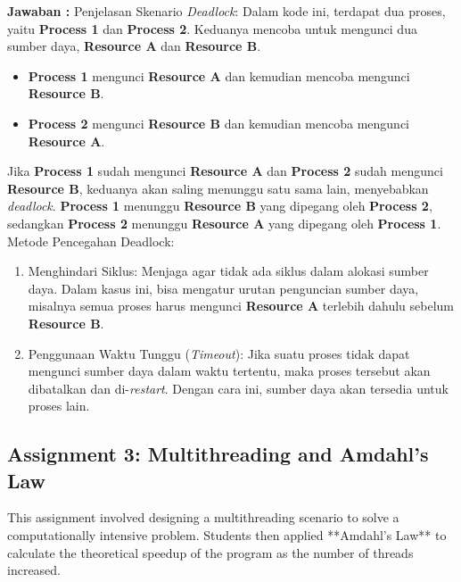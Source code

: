 \documentclass[12pt]{article}
\begin{document}
\textbf{Jawaban : }
Penjelasan Skenario \textit{Deadlock}:
Dalam kode ini, terdapat dua proses, yaitu \textbf{Process 1} dan \textbf{Process 2}. Keduanya mencoba untuk mengunci dua sumber daya, \textbf{Resource A} dan \textbf{\textbf{Resource B}}.
\begin{itemize}
    \item \textbf{Process 1} mengunci \textbf{Resource A} dan kemudian mencoba mengunci \textbf{Resource B}.
    \item \textbf{Process 2} mengunci \textbf{Resource B} dan kemudian mencoba mengunci \textbf{Resource A}.
\end{itemize}
Jika \textbf{Process 1} sudah mengunci \textbf{Resource A} dan \textbf{Process 2} sudah mengunci \textbf{Resource B}, keduanya akan saling menunggu satu sama lain, menyebabkan \textit{deadlock}. \textbf{Process 1} menunggu \textbf{Resource B} yang dipegang oleh \textbf{Process 2}, sedangkan \textbf{Process 2} menunggu \textbf{Resource A} yang dipegang oleh \textbf{Process 1}.
Metode Pencegahan Deadlock:
\begin{enumerate}
    \item Menghindari Siklus: Menjaga agar tidak ada siklus dalam alokasi sumber daya. Dalam kasus ini, bisa mengatur urutan penguncian sumber daya, misalnya semua proses harus mengunci \textbf{Resource A} terlebih dahulu sebelum \textbf{Resource B}.
    \item Penggunaan Waktu Tunggu (\textit{Timeout}): Jika suatu proses tidak dapat mengunci sumber daya dalam waktu tertentu, maka proses tersebut akan dibatalkan dan di-\textit{restart}. Dengan cara ini, sumber daya akan tersedia untuk proses lain.
\end{enumerate}

\subsection{Assignment 3: Multithreading and Amdahl's Law}
This assignment involved designing a multithreading scenario to solve a computationally intensive problem. Students then applied **Amdahl's Law** to calculate the theoretical speedup of the program as the number of threads increased.
\end{document}
